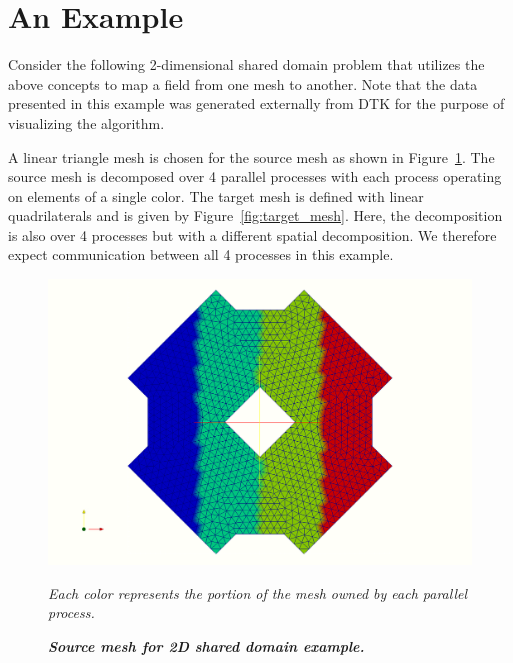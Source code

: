 \documentclass[letterpaper,12pt]{article}
\begin{document}
\clearpage

\section{An Example}
Consider the following 2-dimensional shared domain problem that
utilizes the above concepts to map a field from one mesh to
another. Note that the data presented in this example was generated
externally from DTK for the purpose of visualizing the algorithm.

A linear triangle mesh is chosen for the source mesh as shown in
Figure~\ref{fig:source_mesh}. The source mesh is decomposed over 4
parallel processes with each process operating on elements of a single
color. The target mesh is defined with linear quadrilaterals and is
given by Figure~\ref{fig:target_mesh}. Here, the decomposition is also
over 4 processes but with a different spatial decomposition. We
therefore expect communication between all 4 processes in this
example.

\begin{figure}[htpb!]
  \centering \includegraphics[width=5.5in]{tri_part.png}
  \caption{\bf \sl Source mesh for 2D shared domain example.}{\sl Each
    color represents the portion of the mesh owned by each parallel
    process.}
  \label{fig:source_mesh}
\end{figure}
\end{document}
